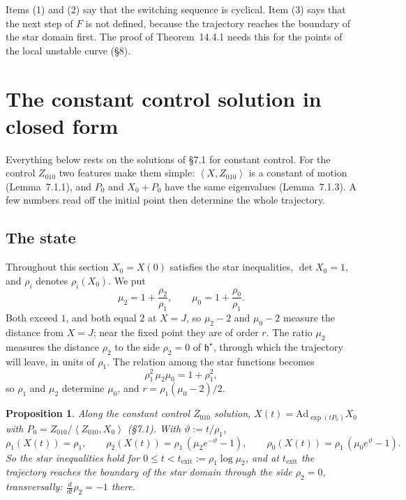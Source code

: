\documentclass[11pt,a4paper]{article}
\theoremstyle{plain}
\newtheorem{proposition}[theorem]{Proposition}
\theoremstyle{definition}
\theoremstyle{remark}
\newcommand{\bracks}[2]{\left\langle #1,#2\right\rangle}
\newcommand{\hstar}{\mathfrak{h}^{\star}}
\newcommand{\Ad}{\mathrm{Ad}}
\newcommand{\tex}{t_{\mathrm{exit}}}
\begin{document}
Items (1) and (2) say that the switching sequence is cyclical. Item (3) says that the next step of
$F$ is not defined, because the trajectory reaches the boundary of the star domain first. The
proof of Theorem~14.4.1 needs this for the points of the local unstable curve (\S8).

\section{The constant control solution in closed form}

Everything below rests on the solutions of \S7.1 for constant control. For the control $Z_{010}$
two features make them simple: $\bracks X{Z_{010}}$ is a constant of motion (Lemma~7.1.1), and
$P_0$ and $X_0+P_0$ have the same eigenvalues (Lemma~7.1.3). A few numbers read off the initial
point then determine the whole trajectory.

\subsection*{The state}

Throughout this section $X_0=X(0)$ satisfies the star inequalities, $\det X_0=1$, and $\rho_i$
denotes $\rho_i(X_0)$. We put
\[
\mu_2=1+\frac{\rho_2}{\rho_1},\qquad \mu_0=1+\frac{\rho_0}{\rho_1}.
\]
Both exceed $1$, and both equal $2$ at $X=J$, so $\mu_2-2$ and $\mu_0-2$ measure the distance from
$X=J$; near the fixed point they are of order $r$. The ratio $\mu_2$ measures the distance $\rho_2$
to the side $\rho_2=0$ of $\hstar$, through which the trajectory will leave, in units of $\rho_1$.
The relation among the star functions becomes
\begin{equation}\tag{2.1}
\rho_1^2\,\mu_2\mu_0=1+\rho_1^2,
\end{equation}
so $\rho_1$ and $\mu_2$ determine $\mu_0$, and $r=\rho_1(\mu_0-2)/2$.

\begin{proposition}
Along the constant control $Z_{010}$ solution, $X(t)=\Ad_{\exp(tP_0)}X_0$ with
$P_0=Z_{010}/\bracks{Z_{010}}{X_0}$ (\S7.1). With $\vartheta:=t/\rho_1$,
\[
\rho_1(X(t))=\rho_1,\qquad \rho_2(X(t))=\rho_1\,(\mu_2e^{-\vartheta}-1),\qquad
\rho_0(X(t))=\rho_1\,(\mu_0e^{\vartheta}-1).
\]
So the star inequalities hold for $0\le t<\tex:=\rho_1\log\mu_2$, and at $\tex$ the trajectory
reaches the boundary of the star domain through the side $\rho_2=0$, transversally:
$\frac{d}{dt}\rho_2=-1$ there.
\end{proposition}
\end{document}
